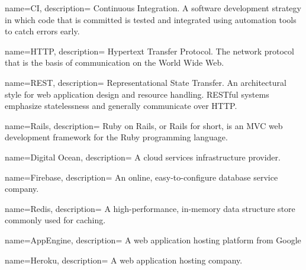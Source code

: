 \documentclass{article}
\begin{document}
{
  name=CI,
  description={
    Continuous Integration. A software development strategy in which code that is committed is tested and integrated using automation tools to catch errors early.
  }
}

{
  name=HTTP,
  description={
    Hypertext Transfer Protocol. The network protocol that is the basis of communication on the World Wide Web.
  }
}

{
  name=REST,
  description={
    Representational State Transfer. An architectural style for web application design and resource handling. RESTful systems emphasize statelessness and generally communicate over HTTP.
  }
}

{
  name=Rails,
  description={
    Ruby on Rails, or Rails for short, is an MVC web development framework for the Ruby programming language.
  }
}

{
  name=Digital Ocean,
  description={
    A cloud services infrastructure provider.
  }
}

{
  name=Firebase,
  description={
    An online, easy-to-configure database service company.
  }
}

{
  name=Redis,
  description={
    A high-performance, in-memory data structure store commonly used for caching. 
  }
}

{
  name=AppEngine,
  description={
    A web application hosting platform from Google
  }
} 

{
  name=Heroku,
  description={
    A web application hosting company.
  }
}



\glsaddall
\printglossaries
\end{document}
